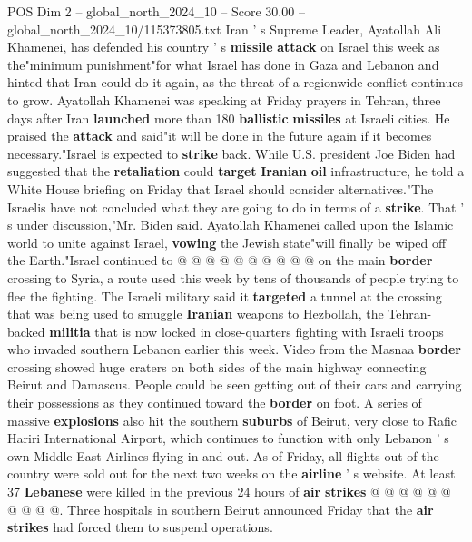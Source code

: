 \begin{textsample}{POS Dim 2 – global\_north\_2024\_10 – Score 30.00 – global\_north\_2024\_10/115373805.txt}  \label{ex:f2_pos_072}
Iran ' s Supreme Leader, Ayatollah Ali Khamenei, has defended his country ' s \textbf{missile} \textbf{attack} on Israel this week as the"minimum punishment"for what Israel has done in Gaza and Lebanon and hinted that Iran could do it again, as the threat of a regionwide conflict continues to grow.
Ayatollah Khamenei was speaking at Friday prayers in Tehran, three days after Iran \textbf{launched} more than 180 \textbf{ballistic} \textbf{missiles} at Israeli cities.
He praised the \textbf{attack} and said"it will be done in the future again if it becomes necessary."Israel is expected to \textbf{strike} back.
While U.S. president Joe Biden had suggested that the \textbf{retaliation} could \textbf{target} \textbf{Iranian} \textbf{oil} infrastructure, he told a White House briefing on Friday that Israel should consider alternatives."The Israelis have not concluded what they are going to do in terms of a \textbf{strike}.
That ' s under discussion,"Mr.
Biden said.
Ayatollah Khamenei called upon the Islamic world to unite against Israel, \textbf{vowing} the Jewish state"will finally be wiped off the Earth."Israel continued to @ @ @ @ @ @ @ @ @ @ on the main \textbf{border} crossing to Syria, a route used this week by tens of thousands of people trying to flee the fighting.
The Israeli military said it \textbf{targeted} a tunnel at the crossing that was being used to smuggle \textbf{Iranian} weapons to Hezbollah, the Tehran-backed \textbf{militia} that is now locked in close-quarters fighting with Israeli troops who invaded southern Lebanon earlier this week.
Video from the Masnaa \textbf{border} crossing showed huge craters on both sides of the main highway connecting Beirut and Damascus.
People could be seen getting out of their cars and carrying their possessions as they continued toward the \textbf{border} on foot.
A series of massive \textbf{explosions} also hit the southern \textbf{suburbs} of Beirut, very close to Rafic Hariri International Airport, which continues to function with only Lebanon ' s own Middle East Airlines flying in and out.
As of Friday, all flights out of the country were sold out for the next two weeks on the \textbf{airline} ' s website.
At least 37 \textbf{Lebanese} were killed in the previous 24 hours of \textbf{air} \textbf{strikes} @ @ @ @ @ @ @ @ @ @.
Three hospitals in southern Beirut announced Friday that the \textbf{air} \textbf{strikes} had forced them to suspend operations.

\end{textsample}
